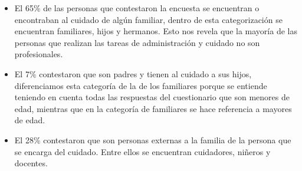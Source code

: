\documentclass[a4paper,12pt]{article}
\begin{document}
    \begin{itemize}
        \item El 65\% de las personas que contestaron la encuesta se encuentran o encontraban al cuidado de algún familiar, dentro de esta categorización se encuentran familiares, hijos y hermanos. Esto nos revela que la mayoría de las personas que realizan las tareas de administración y cuidado no son profesionales.
        \item El 7\% contestaron que son padres y tienen al cuidado a sus hijos, diferenciamos esta categoría de la de los familiares porque se entiende teniendo en cuenta todas las respuestas del cuestionario que son menores de edad, mientras que en la categoría de familiares se hace referencia a mayores de edad.
        \item El 28\% contestaron que son personas externas a la familia de la persona que se encarga del cuidado. Entre ellos se encuentran cuidadores, niñeros y docentes.
    \end{itemize}
\end{document}
